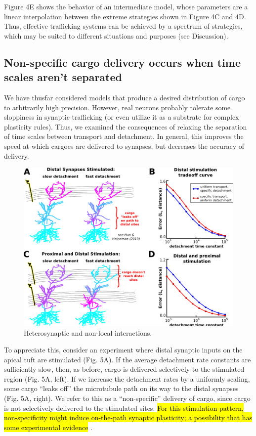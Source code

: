 \documentclass[10pt]{wlpeerj}
\begin{document}
Figure 4E shows the behavior of an intermediate model, whose parameters are a linear interpolation between the extreme strategies shown in Figure 4C and 4D.
Thus, effective trafficking systems can be achieved by a spectrum of strategies, which may be suited to different situations and purposes (see Discussion). 

\subsection*{Non-specific cargo delivery occurs when time scales aren't separated}

We have thusfar considered models that produce a desired distribution of cargo to arbitrarily high precision.
However, real neurons probably tolerate some sloppiness in synaptic trafficking (or even utilize it as a substrate for complex plasticity rules).
Thus, we examined the consequences of relaxing the separation of time scales between transport and detachment.
In general, this improves the speed at which cargoes are delivered to synapses, but decreases the accuracy of delivery.

\begin{figure}[!tb]
\begin{center}
\includegraphics[width=0.9\columnwidth]{05_heterosynaptic_ca1.png}
\caption{Heterosynaptic and non-local interactions.
}
\end{center}
\end{figure}

To appreciate this, consider an experiment where distal synaptic inputs on the apical tuft are stimulated (Fig. 5A).
If the average detachment rate constants are sufficiently slow, then, as before, cargo is delivered selectively to the stimulated region (Fig. 5A, left).
If we increase the detachment rates by a uniformly scaling, some cargo ``leaks off'' the microtubule path on its way to the distal synapses (Fig. 5A, right).
We refer to this as a ``non-specific'' delivery of cargo, since cargo is not selectively delivered to the stimulated sites.
\hl{For this stimulation pattern, non-specificity might induce on-the-path synaptic plasticity; a possibility that has some experimental evidence} \citep{Han_2013}.
\end{document}
